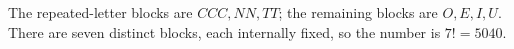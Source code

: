 The repeated-letter blocks are $CCC,NN,TT$; the remaining blocks are $O,E,I,U$. There are seven distinct blocks, each internally fixed, so the number is $\boxed{7!=5040}$.
